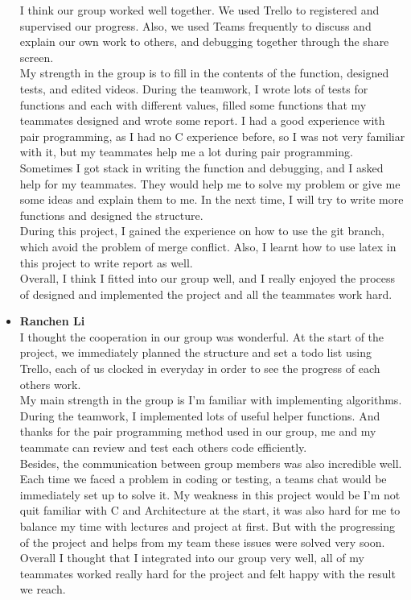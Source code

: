 \documentclass{article}
\begin{document}
\begin{itemize}
    I think our group worked well together. We used Trello to registered and supervised our progress. Also, we used Teams frequently to discuss and explain our own work to others, and debugging together through the share screen.\\ My strength in the group is to fill in the contents of the function, designed tests, and edited videos. During the teamwork, I wrote lots of tests for functions and each with different values, filled some functions that my teammates designed and wrote some report. I had a good experience with pair programming, as I had no C experience before, so I was not very familiar with it, but my teammates help me a lot during pair programming. Sometimes I got stack in writing the function and debugging, and I asked help for my teammates. They would help me to solve my problem or give me some ideas and explain them to me. In the next time, I will try to write more functions and designed the structure. \\
    During this project, I gained the experience on how to use the git branch, which avoid the problem of merge conflict. Also, I learnt how to use latex in this project to write report as well.\\
    Overall, I think I fitted into our group well, and I really enjoyed the process of designed and implemented the project and all the teammates work hard.

    \item \textbf{Ranchen Li}\\
    I thought the cooperation in our group was wonderful. At the start of the project, we immediately planned the structure and set a todo list using Trello, each of us clocked in everyday in order to see the progress of each others work.\\
	My main strength in the group is I’m familiar with implementing algorithms. During the teamwork, I implemented lots of useful helper functions. And thanks for the pair programming method used in our group, me and my teammate can review and test each others code efficiently.\\
	Besides, the communication between group members was also incredible well. Each time we faced a problem in coding or testing, a teams chat would be immediately set up to solve it.
	My weakness in this project would be I’m not quit familiar with C and Architecture at the start, it was also hard for me to balance my time with lectures and project at first. But with the progressing of the project and helps from my team these issues were solved very soon.\\
	Overall I thought that I integrated into our group very well, all of my teammates worked really hard for the project and felt happy with the result we reach.

\end{itemize}
\end{document}
